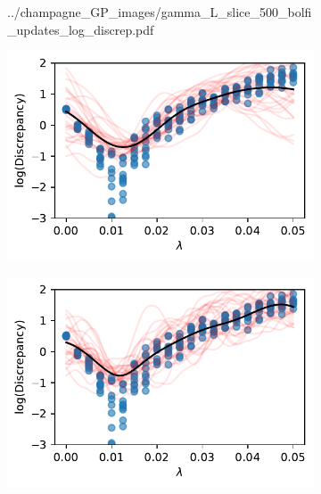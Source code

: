 \begin{figure}[htbp]
\begin{subfigure}[b]{0.5\textwidth}
{            ../champagne_GP_images/gamma_L_slice_500_bolfi_updates_log_discrep.pdf
        }
    \end{subfigure}
    \hfill%
    \begin{subfigure}[b]{0.5\textwidth}
        \centering
        \includegraphics[width=\textwidth]{
            ../champagne_GP_images/initial_lambda_slice_log_discrep.pdf
        }
    \end{subfigure}%
    \hfill%
    \begin{subfigure}[b]{0.5\textwidth}
        \centering
        \includegraphics[width=\textwidth]{
            ../champagne_GP_images/lambda_slice_500_bolfi_updates_log_discrep.pdf
        }
    \end{subfigure}
    \begin{subfigure}[b]{0.5\textwidth}
        \centering

\end{subfigure}
\end{figure}
